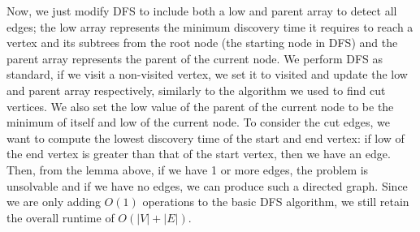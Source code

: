 \documentclass[12pt]{article}
\begin{document}
	Now, we just modify DFS to include both a low and parent array to detect all edges; the low array represents the minimum discovery time it requires to reach a vertex and its subtrees from the root node (the starting node in DFS) and the parent array represents the parent of the current node. We perform DFS as standard, if we visit a non-visited vertex, we set it to visited and update the low and parent array respectively, similarly to the algorithm we used to find cut vertices. We also set the low value of the parent of the current node to be the minimum of itself and low of the current node. To consider the cut edges, we want to compute the lowest discovery time of the start and end vertex: if low of the end vertex is greater than that of the start vertex, then we have an edge. Then, from the lemma above, if we have 1 or more edges, the problem is unsolvable and if we have no edges, we can produce such a directed graph. Since we are only adding $O(1)$ operations to the basic DFS algorithm, we still retain the overall runtime of $O(|V|+|E|)$.
\end{document}
